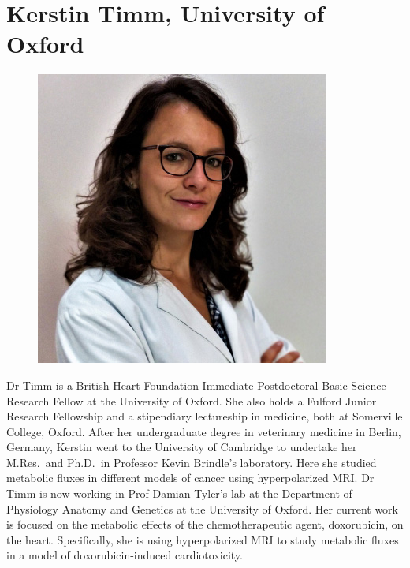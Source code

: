 \documentclass[a5paper,10pt,twoside,onecolumn,openany,helvetica,showtrims]{memoir}
\newlength{\SpeakerSize}
\begin{document}
\section*{Kerstin Timm, University of Oxford}
\begin{figure}
\includegraphics[width=\SpeakerSize]{SpeakerPics/image2}	
\end{figure}
Dr Timm is a British Heart Foundation Immediate Postdoctoral Basic Science Research Fellow at the University of Oxford. She also holds a Fulford Junior Research Fellowship and a stipendiary lectureship in medicine, both at Somerville College, Oxford. After her undergraduate degree in veterinary medicine in Berlin, Germany, Kerstin went to the University of Cambridge to undertake her M.Res.~and Ph.D.~in Professor Kevin Brindle's laboratory. Here she studied metabolic fluxes in different models of cancer using hyperpolarized MRI. Dr Timm is now working in Prof Damian Tyler’s lab at the Department of Physiology Anatomy and Genetics at the University of Oxford. Her current work is focused on the metabolic effects of the chemotherapeutic agent, doxorubicin, on the heart. Specifically, she is using hyperpolarized MRI to study metabolic fluxes in a model of doxorubicin-induced cardiotoxicity. 
\clearpage
\end{document}
